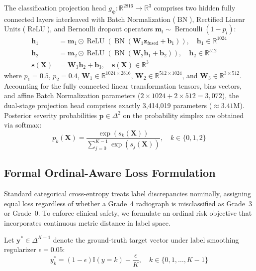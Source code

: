 \documentclass[10pt,journal]{IEEEtran}
\begin{document}
The classification projection head $g_{\bm{\psi}}: \mathbb{R}^{2816} \to \mathbb{R}^3$ comprises two hidden fully connected layers interleaved with Batch Normalization ($\operatorname{BN}$), Rectified Linear Units ($\operatorname{ReLU}$), and Bernoulli dropout operators $\mathbf{m}_l \sim \operatorname{Bernoulli}(1 - p_l)$:
\begin{align}
\mathbf{h}_1 &= \mathbf{m}_1 \odot \operatorname{ReLU}\left(\operatorname{BN}\left(\mathbf{W}_1 \mathbf{z}_{\text{fused}} + \mathbf{b}_1\right)\right), \quad \mathbf{h}_1 \in \mathbb{R}^{1024} \label{eq:head1}\\
\mathbf{h}_2 &= \mathbf{m}_2 \odot \operatorname{ReLU}\left(\operatorname{BN}\left(\mathbf{W}_2 \mathbf{h}_1 + \mathbf{b}_2\right)\right), \quad \mathbf{h}_2 \in \mathbb{R}^{512} \label{eq:head2}\\
\mathbf{s}(\mathbf{X}) &= \mathbf{W}_3 \mathbf{h}_2 + \mathbf{b}_3, \quad \mathbf{s}(\mathbf{X}) \in \mathbb{R}^{3} \label{eq:logits}
\end{align}
where $p_1 = 0.5$, $p_2 = 0.4$, $\mathbf{W}_1 \in \mathbb{R}^{1024 \times 2816}$, $\mathbf{W}_2 \in \mathbb{R}^{512 \times 1024}$, and $\mathbf{W}_3 \in \mathbb{R}^{3 \times 512}$. Accounting for the fully connected linear transformation tensors, bias vectors, and affine Batch Normalization parameters ($2 \times 1024 + 2 \times 512 = 3{,}072$), the dual-stage projection head comprises exactly 3,414,019 parameters ($\approx 3.41\text{M}$). Posterior severity probabilities $\mathbf{p} \in \Delta^2$ on the probability simplex are obtained via softmax:
\begin{equation}
p_k(\mathbf{X}) = \frac{\exp(s_k(\mathbf{X}))}{\sum_{j=0}^{K-1} \exp(s_j(\mathbf{X}))}, \quad k \in \{0, 1, 2\}
\label{eq:softmax}
\end{equation}

\subsection{Formal Ordinal-Aware Loss Formulation}
\label{subsec:loss}

Standard categorical cross-entropy treats label discrepancies nominally, assigning equal loss regardless of whether a Grade~4 radiograph is misclassified as Grade~3 or Grade~0. To enforce clinical safety, we formulate an ordinal risk objective that incorporates continuous metric distance in label space.

Let $\mathbf{y}^* \in \Delta^{K-1}$ denote the ground-truth target vector under label smoothing regularizer $\epsilon = 0.05$:
\begin{equation}
y_k^* = (1 - \epsilon)\mathbb{I}(y = k) + \frac{\epsilon}{K}, \quad k \in \{0, 1, \dots, K-1\}
\label{eq:smoothed_label}
\end{equation}
\end{document}
